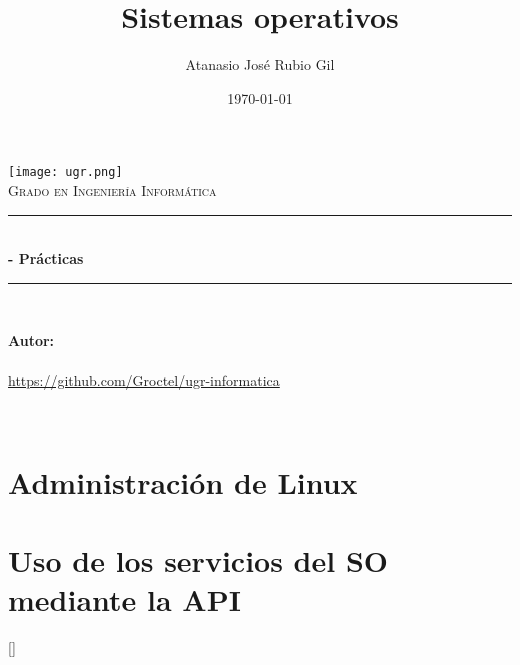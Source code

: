 \documentclass[10pt, spanish]{report}
\title{%
	Sistemas operativos
}
\author{%
	Atanasio José Rubio Gil
}
\date{%
	\today
}
\makeatletter
\let\thetitle\@title
\let\theauthor\@author
\let\thedate\@date
\makeatother
\begin{document}
\begin{titlepage}
	\centering
	\texttt{[image: ugr.png]}\\
	\textsc{\Huge Grado en Ingeniería Informática}\\[0.5 cm]
	\rule{\linewidth}{0.2 mm}\\[0.2 cm]
	{\huge\bfseries\thetitle- Prácticas}\\
		\rule{\linewidth}{0.2 mm}\\[1 cm]

	\begin{center} \large
		\textbf{Autor:}\\
		\theauthor\\
		{\url{https://github.com/Groctel/ugr-informatica}}\\[1 cm]
	\end{center}

	{\large \thedate}\\[1.5 cm]
	{\doclicenseThis}
	\vfill
\end{titlepage}

\tableofcontents
\pagebreak

\chapter{Administración de Linux}
 \pagebreak
 \pagebreak
 \pagebreak


\chapter{Uso de los servicios del SO mediante la API}
 \pagebreak
 \pagebreak
 \pagebreak
 \pagebreak


\setcounter{chapter}{0}
[]
\renewcommand{\thesubsection}{\MakeUppercase{\alph{chapter}}.\arabic{subsection}}

 \pagebreak
   \pagebreak
    \pagebreak

\end{document}
